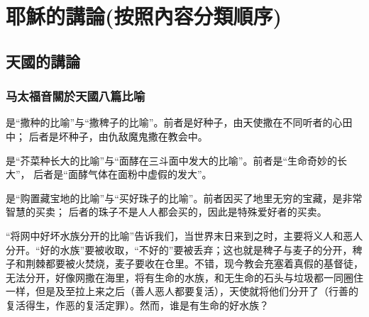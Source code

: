 






\section{耶穌的講論(按照內容分類順序)}
\subsection{天國的講論}
\subsubsection{马太福音關於天國八篇比喻}
是“撒种的比喻”与“撒稗子的比喻”。前者是好种子，由天使撒在不同听者的心田中；
后者是坏种子，由仇敌魔鬼撒在教会中。

是“芥菜种长大的比喻”与“面酵在三斗面中发大的比喻”。前者是“生命奇妙的长大”，
后者是“面酵气体在面粉中虚假的发大”。

是“购置藏宝地的比喻”与“买好珠子的比喻”。前者因买了地里无穷的宝藏，是非常智慧的买卖；
后者的珠子不是人人都会买的，因此是特殊爱好者的买卖。

“将网中好坏水族分开的比喻”告诉我们，当世界末日来到之时，主要将义人和恶人分开。“好的水族”要被收取，“不好的”要被丢弃；这也就是稗子与麦子的分开，稗子和荆棘都要被火焚烧，麦子要收在仓里。不错，现今教会充塞着真假的基督徒，无法分开，好像网撒在海里，将有生命的水族，和无生命的石头与垃圾都一同圈住一样，但是及至拉上来之后（善人恶人都要复活），天使就将他们分开了（行善的复活得生，作恶的复活定罪）。然而，谁是有生命的好水族？

